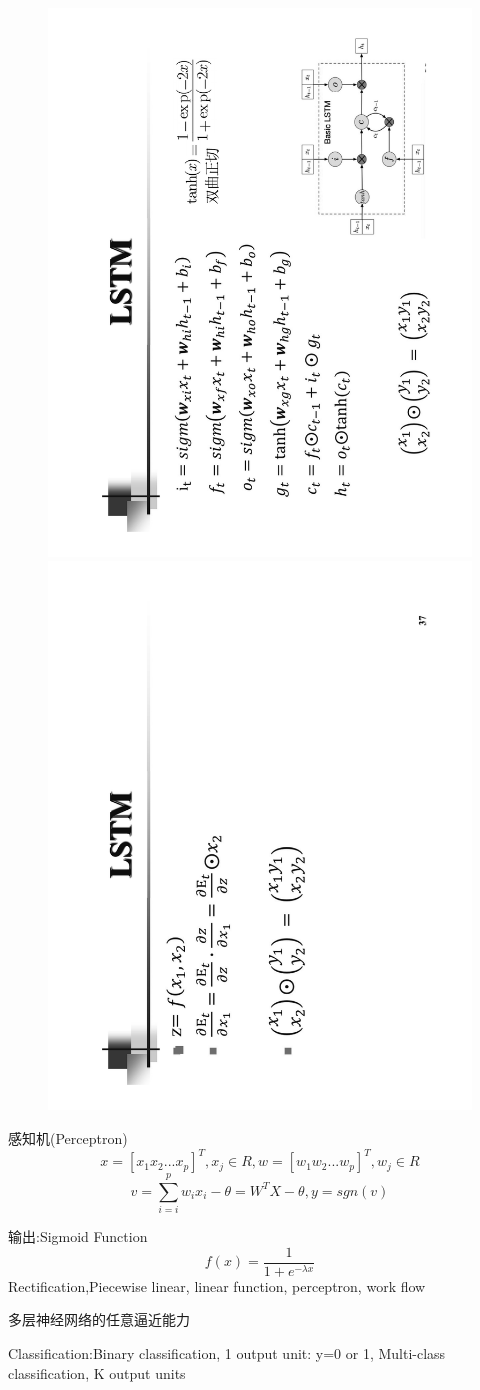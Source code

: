 \documentclass[UTF8,a4paper,landscape,16pt]{paper}
\begin{document}
\begin{multicols}{4}
\begin{figure}[H]
\end{figure}
\begin{figure}[H]
\centering\includegraphics[height=\columnwidth,angle = -90]{NN/14.pdf}
\includegraphics[height=\columnwidth,angle = -90]{NN/15.pdf}
\end{figure}
\noindent 感知机(Perceptron)$$x = [x_{1} x_{2} ...x_{p}]^{T}, x_{j}\in R,w = [w_{1} w_{2} ...w_{p}]^{T}, w_{j}\in R$$$$v  = \sum_{i=i}^p w_{i}x_{i}-\theta=W^{T}X - \theta,y = sgn(v)$$

\noindent 输出:Sigmoid Function $$f(x)=\frac{1}{1+e^{-\lambda x}}$$
Rectification,Piecewise linear, linear function, perceptron, work flow

\noindent 多层神经网络的任意逼近能力

\noindent Classification:Binary classification,  1 output unit: y=0 or 1,  Multi-class classification,  K output units
\end{multicols}
\end{document}
